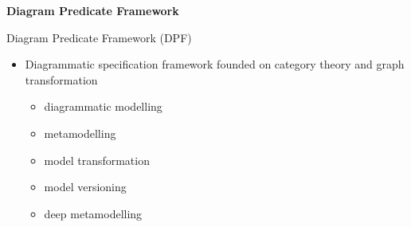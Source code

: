 \documentclass[dvips,slidetop,mathserif,brown]{beamer}
\begin{document}
\begin{frame}{}
  \begin{center}
    \begin{Huge}
      \textbf{Diagram Predicate Framework}
    \end{Huge}
  \end{center}
\end{frame}

\begin{frame}{Diagram Predicate Framework (DPF)}
  \begin{itemize}
    \item Diagrammatic specification framework founded on category theory and graph transformation
    \begin{itemize}
      \item diagrammatic modelling
      \item metamodelling
      \item model transformation
      \item model versioning
      \item deep metamodelling
    \end{itemize}
  \end{itemize}
\end{frame}
\end{document}
